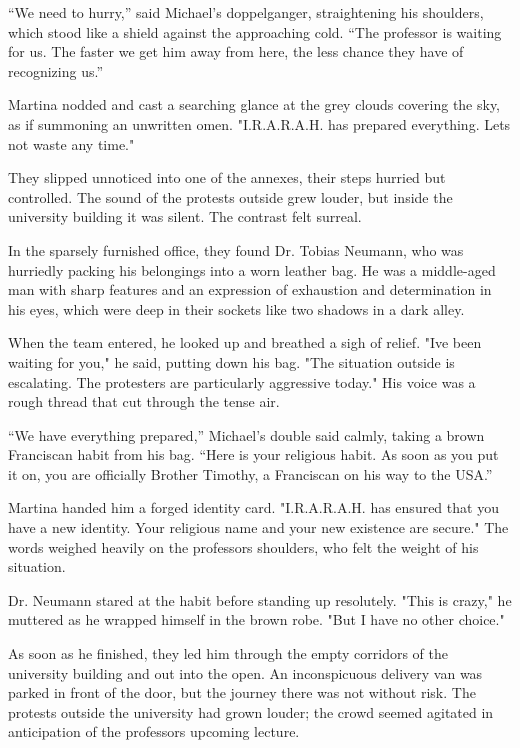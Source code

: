 \documentclass[
]{article}
\begin{document}
``We need to hurry,'' said Michael's doppelganger, straightening his shoulders, which stood like a shield against the approaching cold. ``The professor is waiting for us. The faster we get him away from here, the less chance they have of recognizing us.''

Martina nodded and cast a searching glance at the grey clouds covering the sky, as if summoning an unwritten omen. "I.R.A.R.A.H. has prepared everything. Let\textquotesingle s not waste any time."

They slipped unnoticed into one of the annexes, their steps hurried but controlled. The sound of the protests outside grew louder, but inside the university building it was silent. The contrast felt surreal.

In the sparsely furnished office, they found Dr. Tobias Neumann, who was hurriedly packing his belongings into a worn leather bag. He was a middle-aged man with sharp features and an expression of exhaustion and determination in his eyes, which were deep in their sockets like two shadows in a dark alley.

When the team entered, he looked up and breathed a sigh of relief. "I\textquotesingle ve been waiting for you," he said, putting down his bag. "The situation outside is escalating. The protesters are particularly aggressive today." His voice was a rough thread that cut through the tense air.

``We have everything prepared,'' Michael's double said calmly, taking a brown Franciscan habit from his bag. ``Here is your religious habit. As soon as you put it on, you are officially Brother Timothy, a Franciscan on his way to the USA.''

Martina handed him a forged identity card. "I.R.A.R.A.H. has ensured that you have a new identity. Your religious name and your new existence are secure." The words weighed heavily on the professor\textquotesingle s shoulders, who felt the weight of his situation.

Dr. Neumann stared at the habit before standing up resolutely. "This is crazy," he muttered as he wrapped himself in the brown robe. "But I have no other choice."

As soon as he finished, they led him through the empty corridors of the university building and out into the open. An inconspicuous delivery van was parked in front of the door, but the journey there was not without risk. The protests outside the university had grown louder; the crowd seemed agitated in anticipation of the professor\textquotesingle s upcoming lecture.
\end{document}
